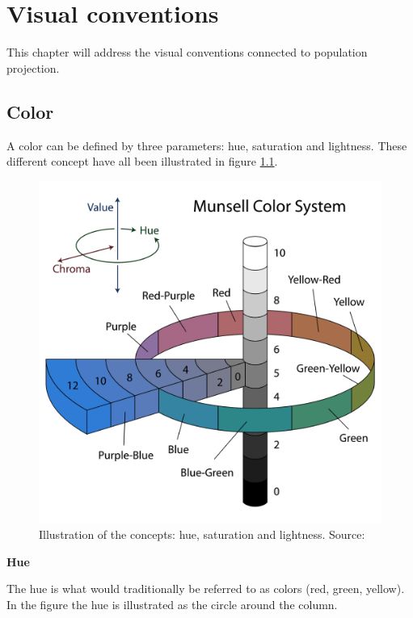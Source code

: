 \chapter{Visual conventions}\label{CVisualConventions}
This chapter will address the visual conventions connected to population projection. 

%



\section{Color}
A color can be defined by three parameters: hue, saturation and lightness. These different concept have all been illustrated in figure \ref{MunsellColorSystem}.

\begin{figure} [H]
	\centering
	\includegraphics[width=.4\textwidth]{Pictures/MunsellColorSystem}
	\caption{Illustration of the concepts: hue, saturation and lightness. Source: \citet{JacobRus}}
	\label{MunsellColorSystem}
\end{figure}

\textbf{Hue}

The hue is what would traditionally be referred to as colors (red, green, yellow). In the figure the hue is illustrated as the circle around the column.

